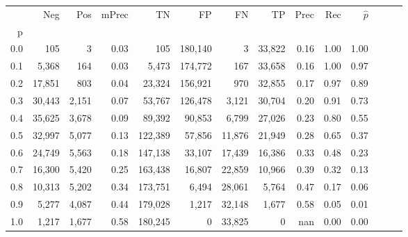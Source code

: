 \begin{tabular}{rrrrrrrrrrrrrr}
\toprule
{} &     Neg &    Pos & mPrec &       TN &       FP &      FN &      TP &  Prec &   Rec & $\hat{p}$ \\
p   &         &        &       &          &          &         &         &       &       &           \\
\midrule
0.0 &     105 &      3 &  0.03 &      105 &  180,140 &       3 &  33,822 &  0.16 &  1.00 &      1.00 \\
0.1 &   5,368 &    164 &  0.03 &    5,473 &  174,772 &     167 &  33,658 &  0.16 &  1.00 &      0.97 \\
0.2 &  17,851 &    803 &  0.04 &   23,324 &  156,921 &     970 &  32,855 &  0.17 &  0.97 &      0.89 \\
0.3 &  30,443 &  2,151 &  0.07 &   53,767 &  126,478 &   3,121 &  30,704 &  0.20 &  0.91 &      0.73 \\
0.4 &  35,625 &  3,678 &  0.09 &   89,392 &   90,853 &   6,799 &  27,026 &  0.23 &  0.80 &      0.55 \\
0.5 &  32,997 &  5,077 &  0.13 &  122,389 &   57,856 &  11,876 &  21,949 &  0.28 &  0.65 &      0.37 \\
0.6 &  24,749 &  5,563 &  0.18 &  147,138 &   33,107 &  17,439 &  16,386 &  0.33 &  0.48 &      0.23 \\
0.7 &  16,300 &  5,420 &  0.25 &  163,438 &   16,807 &  22,859 &  10,966 &  0.39 &  0.32 &      0.13 \\
0.8 &  10,313 &  5,202 &  0.34 &  173,751 &    6,494 &  28,061 &   5,764 &  0.47 &  0.17 &      0.06 \\
0.9 &   5,277 &  4,087 &  0.44 &  179,028 &    1,217 &  32,148 &   1,677 &  0.58 &  0.05 &      0.01 \\
1.0 &   1,217 &  1,677 &  0.58 &  180,245 &        0 &  33,825 &       0 &   nan &  0.00 &      0.00 \\
\bottomrule
\end{tabular}
